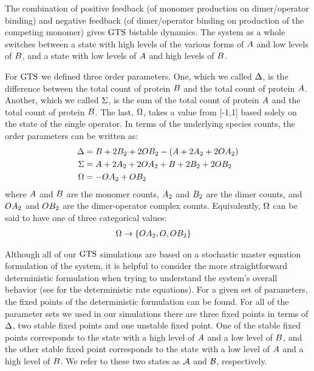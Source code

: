 The combination of positive feedback (of monomer production on dimer/operator binding) and negative feedback (of dimer/operator binding on production of the competing monomer) gives $\text{GTS}$ bistable dynamics\supercite{Biancalani:2015ii}. The system as a whole switches between a state with high levels of the various forms of $A$ and low levels of $B$, and a state with low levels of $A$ and high levels of $B$.

For $\text{GTS}$ we defined three order parameters. One, which we called $\Delta$, is the difference between the total count of protein $B$ and the total count of protein $A$. Another, which we called $\Sigma$, is the sum of the total count of protein $A$ and the total count of protein $B$. The last, $\Omega$, takes a value from [-1,1] based solely on the state of the single operator. In terms of the underlying species counts, the order parameters can be written as:
\begin{align*}
    \Delta &= B + 2B_2 + 2OB_2 - \left( A + 2A_2 + 2OA_2 \right) \\
    \Sigma &= A + 2A_2 + 2OA_2 + B + 2B_2 + 2OB_2 \\
    \Omega &= -OA_2 + OB_2
\end{align*}
where $A$ and $B$ are the monomer counts, $A_2$ and $B_2$ are the dimer counts, and $OA_2$ and $OB_2$ are the dimer-operator complex counts. Equivalently, $\Omega$ can be said to have one of three categorical values:
    \begin{align*}
        \Omega &\rightarrow \{OA_2, O, OB_2\}
    \end{align*}

Although all of our $\text{GTS}$ simulations are based on a stochastic master equation formulation of the system, it is helpful to consider the more straightforward deterministic formulation when trying to understand the system's overall behavior (see  for the deterministic rate equations). For a given set of parameters, the fixed points of the deterministic formulation can be found. For all of the parameter sets we used in our simulations there are three fixed points in terms of $\Delta$, two stable fixed points and one unstable fixed point. One of the stable fixed points corresponds to the state with a high level of $A$ and a low level of $B$, and the other stable fixed point corresponds to the state with a low level of $A$ and a high level of $B$. We refer to these two states as $\mathcal{A}$ and $\mathcal{B}$, respectively.

